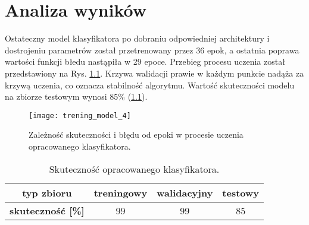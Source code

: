 \chapter{Analiza wyników}
\label{cha:analiza_wynikow}

Ostateczny model klasyfikatora po dobraniu odpowiedniej architektury i dostrojeniu parametrów został przetrenowany przez 36 epok, a ostatnia poprawa wartości funkcji błedu nastąpiła w 29 epoce. Przebieg procesu uczenia został przedstawiony na Rys. \ref{fig:trening_model_4}. Krzywa walidacji prawie w każdym punkcie nadąża za krzywą uczenia, co oznacza stabilność algorytmu. Wartość skuteczności modelu na zbiorze testowym wynosi 85\% (\ref{tab:acc}).

\begin{figure}[h!]
	\centering
	\centering
		\texttt{[image: trening\_model\_4]}	
	\caption{Zależność skuteczności i błędu od epoki w procesie uczenia opracowanego klasyfikatora.}\label{fig:trening_model_4}
\end{figure}

\begin{table}[h!]
\centering
\caption[Short Heading]{Skuteczność opracowanego klasyfikatora.}
\label{tab:acc}
\begin{tabular}{|c|c|c|c|}
\hline
\textbf{typ zbioru}           & \textbf{treningowy} & \textbf{walidacyjny} & \textbf{testowy} \\ \hline
\textbf{skuteczność {[}\%{]}} & 99                  & 99                   & 85               \\ \hline
\end{tabular}
\end{table}

